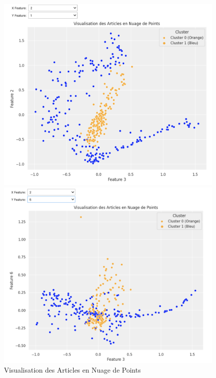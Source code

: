 \documentclass{article}
\begin{document}
\begin{figure}[h]
    \centering
    \begin{minipage}{.5\textwidth}
        \centering
        \includegraphics[width=1\linewidth]{visu.png}
    \end{minipage}%
    \begin{minipage}{.5\textwidth}
        \centering
        \includegraphics[width=1\linewidth]{visu2.png}
    \end{minipage}
            \caption{Visualisation des Articles en Nuage de Points}
\end{figure}
\end{document}
